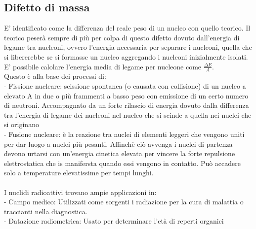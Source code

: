 \subsection{Difetto di massa}
E' identificato come la differenza del reale peso di un nucleo con quello teorico. Il teorico peserà sempre di più per colpa di questo difetto dovuto dall'energia di legame tra nucleoni, ovvero l'energia necessaria per separare i nucleoni, quella che si libererebbe se si formasse un nucleo aggregando i nucleoni inizialmente isolati.\\
E' possibile calolare l'energia media di legame per nucleone come $\frac{\Delta E}{A}$.\\
Questo è alla base dei processi di:\\
\tab- Fissione nucleare: scissione spontanea (o causata con collisione) di un nucleo a elevato A in due o più frammenti a basso peso con emissione di un certo numero di neutroni. Accompagnato da un forte rilascio di energia dovuto dalla differenza tra l'energia di legame dei nucleoni nel nucleo che si scinde a quella nei nuclei che si originano\\
\tab- Fusione nucleare: è la reazione tra nuclei di elementi leggeri che vengono uniti per dar luogo a nuclei più pesanti. Affinchè ciò avvenga i nuclei di partenza devono urtarsi con un'energia cinetica elevata per vincere la forte repulsione elettrostatica che is manifersta quando essi vengono in contatto. Può accadere solo a temperature elevatissime per tempi lunghi.\\\\
I nuclidi radioattivi trovano ampie applicazioni in:\\
\tab- Campo medico: Utilizzati come sorgenti i radiazione per la cura di malattia o traccianti nella diagnostica.\\
\tab- Datazione radiometrica: Usato per determinare l'età di reperti organici